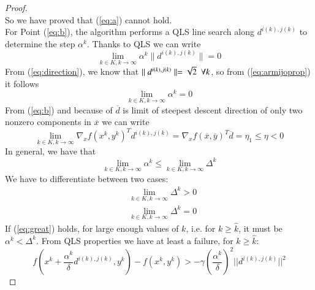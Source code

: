 \begin{proof}
\begin{equation}
\end{equation}
So we have proved that (\ref{eq:a}) cannot hold.\\
For Point (\ref{eq:b}), the algorithm performs a QLS line search along $d^{i(k),j(k)}$ to determine the step $\alpha^{k}$. Thanks to QLS we can write
\begin{equation}\label{eq:armijoprop}
\lim_{k \in K, k \rightarrow \infty} \alpha^{k} \parallel d^{i(k),j(k)} \parallel = 0
\end{equation}
From (\ref{eq:direction}), we know that $\parallel d^{i(k),j(k)} \parallel = \sqrt{2} \enskip\forall k$, so from (\ref{eq:armijoprop}) it follows
\begin{equation}\label{eq:alpha}%
\lim_{k \in K, k \rightarrow \infty} \alpha^{k}=0
\end{equation}
From (\ref{eq:b}) and because of $\overline{d}$ is limit of steepest descent direction of only two nonzero components in $\overline{x}$ we can write
\begin{equation}\label{eq:wrong}
\lim_{k \in K, k \rightarrow \infty} \nabla_x f(x^k, y^k)^T d^{i(k),j(k)} = \nabla_x f(\overline{x},\overline{y})^T \overline{d} = \eta_1 \le \eta < 0
\end{equation}
In general, we have that
\begin{equation}
\lim_{k \in K, k \rightarrow \infty} \alpha^k \leq \lim_{k \in K, k \rightarrow \infty} \Delta^k
\end{equation}
We have to differentiate between two cases:
\begin{subequations}
\begin{align}
& \lim_{k \in K, k \rightarrow \infty} \Delta^k > 0 \label{eq:great}\\
& \lim_{k \in K, k \rightarrow \infty} \Delta^k = 0 \label{eq:zero}
\end{align}
\end{subequations}
If (\ref{eq:great}) holds, for large enough values of $k$, i.e. for $k \geq \hat{k}$, it must be $\alpha^k < \Delta^k$. From QLS properties we have at least a failure, for $k \geq \hat{k}$:
\begin{equation}\label{eq:arm1}
f(x^k + \frac{\alpha^k}{\delta} d^{i(k),j(k)}, y^k) - f(x^k,y^k) > -\gamma \left(\frac{\alpha^k}{\delta}\right)^2 ||d^{i(k),j(k)}||^2

\end{equation}
\end{proof}
